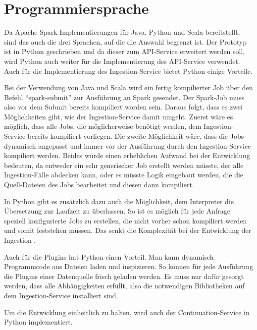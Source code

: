 \section{Programmiersprache}

Da Apache Spark Implementierungen für Java, Python und Scala bereitstellt, sind das auch die drei Sprachen, auf die die Auswahl begrenzt ist.
Der Prototyp ist in Python geschrieben und da dieser zum API-Service erweitert werden soll, wird Python auch weiter für die Implementierung des API-Service verwendet.
Auch für die Implementierung des Ingestion-Service bietet Python einige Vorteile.

Bei der Verwendung von Java und Scala wird ein fertig kompilierter Job über den Befehl "`spark-submit"' zur Ausführung an Spark gesendet.
Der Spark-Job muss also vor dem Submit bereits kompiliert worden sein.
Daraus folgt, dass es zwei Möglichkeiten gibt, wie der Ingestion-Service damit umgeht.
Zuerst wäre es möglich, dass alle Jobs, die möglicherweise benötigt werden, dem Ingestion-Service bereits kompiliert vorliegen.
Die zweite Möglichkeit wäre, dass die Jobs dynamisch angepasst und immer vor der Ausführung durch den Ingestion-Service kompiliert werden.
Beides würde einen erheblichen Aufwand bei der Entwicklung bedeuten, da entweder ein sehr generischer Job erstellt werden müsste, der alle Ingestion-Fälle abdecken kann, oder es müsste Logik eingebaut werden, die die Quell-Dateien des Jobs bearbeitet und diesen dann kompiliert.

In Python gibt es zusätzlich dazu auch die Möglichkeit, dem Interpreter die Übersetzung zur Laufzeit zu überlassen.
So ist es möglich für jede Anfrage speziell konfigurierte Jobs zu erstellen, die nicht vorher schon kompiliert werden und somit feststehen müssen.
Das senkt die Komplexität bei der Entwicklung der Ingestion \parencite{pyspark-int}.

Auch für die Plugins hat Python einen Vorteil.
Man kann dynamisch Programmcode aus Dateien laden und inspizieren.
So können für jede Ausführung die Plugins einer Datenquelle frisch geladen werden.
Es muss nur dafür gesorgt werden, dass alle Abhängigkeiten erfüllt, also die notwendigen Bibliotheken auf dem Ingestion-Service installiert sind.

Um die Entwicklung einheitlich zu halten, wird auch der Continuation-Service in Python implementiert.